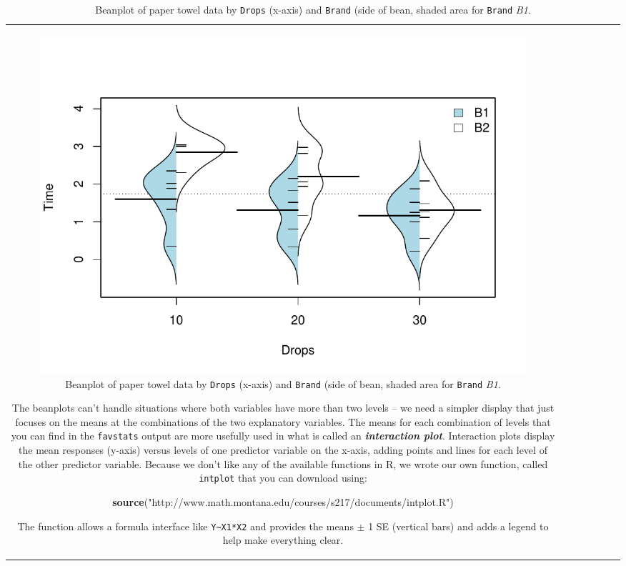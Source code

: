\documentclass[]{book}
\newenvironment{Shaded}{\begin{snugshade}}{\end{snugshade}}
\newcommand{\KeywordTok}[1]{\textcolor[rgb]{0.13,0.29,0.53}{\textbf{#1}}}
\newcommand{\StringTok}[1]{\textcolor[rgb]{0.31,0.60,0.02}{#1}}
\newcommand{\NormalTok}[1]{#1}
\theoremstyle{definition}
\theoremstyle{definition}
\theoremstyle{remark}
\begin{document}
\begin{longtable}[]{@{}ccccccc@{}}
\begin{minipage}[b]{0.10\columnwidth}
\begin{figure}
\centering
\includegraphics{04-twoWayAnova_files/figure-latex/Figure4-1-1.pdf}
\caption{\label{fig:Figure4-1}Beanplot of paper towel data by \texttt{Drops} (x-axis) and
\texttt{Brand} (side of bean, shaded area for \texttt{Brand} \emph{B1}.}
\end{figure}

The beanplots can't handle situations where both variables have more
than two levels -- we need a simpler display that just focuses on the
means at the combinations of the two explanatory variables. The means
for each combination of levels that you can find in the
\texttt{favstats} output are more usefully used in what is called an
\textbf{\emph{interaction plot}}. Interaction plots display the mean
responses (y-axis) versus levels of one predictor variable on the
x-axis, adding points and lines for each level of the other predictor
variable. Because we don't like any of the available functions in R, we
wrote our own function, called \texttt{intplot} that you can download
using:

\begin{Shaded}
\begin{Highlighting}[]
\KeywordTok{source}\NormalTok{(}\StringTok{"http://www.math.montana.edu/courses/s217/documents/intplot.R"}\NormalTok{)}
\end{Highlighting}
\end{Shaded}

The function allows a formula interface like
\texttt{Y\textasciitilde{}X1*X2} and provides the means \(\pm\) 1 SE
(vertical bars) and adds a legend to help make everything clear.





\end{minipage}
\end{longtable}
\end{document}
